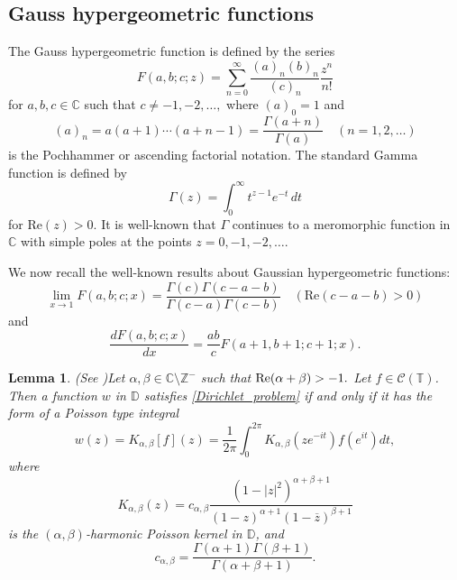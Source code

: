 \documentclass[11pt, reqno]{amsart}
\newtheorem{lemma}{Lemma}
\theoremstyle{definition}
\numberwithin{equation}{section}
\theoremstyle{remark}
\numberwithin{equation}{section}
\newcommand{\ID}{{\mathbb D}}
\begin{document}
   
        

 
	
	\subsection{Gauss hypergeometric functions}
	
	The Gauss hypergeometric function is defined by the series
	$$
	F(a, b; c; z) = \sum_{n=0}^{\infty} \frac{(a)_n (b)_n}{(c)_n} \frac{z^n}{n!}
	$$
	for $a,b,c \in \mathbb{C}$ such that $c\neq-1,-2,\dots,$ where \((a)_0 = 1\) and $$(a)_n = a(a+1) \cdots (a+n-1)=\frac{\Gamma(a+n)}{\Gamma(a)} \quad (n=1,2,\ldots)$$ is the Pochhammer or ascending factorial notation. The standard Gamma function is defined by $$\Gamma(z)=\int_{0}^{\infty}t^{z-1}e^{-t}\,dt$$ for $\mbox{Re}(z)>0$. It is well-known that $\Gamma$ continues to a meromorphic function in $\mathbb{C}$ with simple poles at the points $z=0,-1,-2,\dots$.
	
	We now recall the well-known results \cite[Chapter 2] {Specialfunctions} about Gaussian hypergeometric functions:
	\begin{equation}\label{F(a,b;c;x)prop_1}
		\lim_{x \to 1} F(a,b;c;x) = \frac{\Gamma(c) \Gamma(c - a - b)}{\Gamma(c - a)\Gamma(c - b)}\quad  (\mbox{Re}(c - a - b) > 0)
	\end{equation}
	 and 
     \begin{equation}\label{F(a,b;c;x)prop_2}
     \frac{dF(a,b;c;x)}{dx} = \frac{ab}{c} F(a+1, b+1; c+1; x).
     \end{equation}

      \begin{lemma} {\rm(See \cite{KlintbergOlofsson})}\label{Poisson_integral_Rep}
		Let $\alpha,\beta \in \mathbb{C} \setminus \mathbb{Z}^-$ such that $\mbox{\rm Re}(\alpha+\beta)>-1.$ Let $f\in \mathcal{C}(\mathbb{T})$. Then a function $w$ in $\ID$ satisfies \eqref{Dirichlet_problem} if and only if it has the form of a Poisson type integral
		\begin{equation}\label{poisson_integral}
			w(z) = K_{\alpha,\beta}[f](z) = \frac{1}{2\pi} \int_0^{2\pi} K_{\alpha,\beta}\left(z e^{-it}\right) f\left(e^{it}\right)dt,
		\end{equation}
		where
		\[
		K_{\alpha,\beta}(z) = c_{\alpha,\beta} \frac{(1 - |z|^2)^{\alpha + \beta + 1}}{(1 - z)^{\alpha+1} (1 - \overline{z})^{\beta+1}}
		\]
		is the $(\alpha,\beta)$-harmonic Poisson kernel in $\ID$, and
		\begin{equation}\label{23}
		c_{\alpha,\beta} = \frac{\Gamma(\alpha+1) \Gamma(\beta+1)}{\Gamma(\alpha + \beta + 1)}.
		\end{equation}
	\end{lemma}
\end{document}
